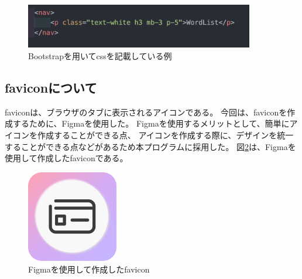 \documentclass[11pt,a4paper]{jsarticle}
\begin{document}
\begin{figure}[htbp]
    \begin{center}
        \includegraphics[width=100mm]{./img/ptag.png}
    \end{center}
    \caption{Bootstrapを用いてcssを記載している例}
    \label{fig:ptag}
\end{figure}



\subsection{faviconについて}
faviconは、ブラウザのタブに表示されるアイコンである。
今回は、faviconを作成するために、Figmaを使用した。
Figmaを使用するメリットとして、簡単にアイコンを作成することができる点、
アイコンを作成する際に、デザインを統一することができる点などがあるため本プログラムに採用した。
図\ref{fig:favicon}は、Figmaを使用して作成したfaviconである。

\begin{figure}[htbp]
    \begin{center}
        \includegraphics[width=40mm]{./img/favicon.png}
    \end{center}
    \caption{Figmaを使用して作成したfavicon}
    \label{fig:favicon}
\end{figure}
\end{document}
